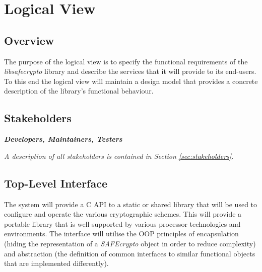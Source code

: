 
\section{Logical View}
\label{sec_view_logical}

\subsection{Overview}

The purpose of the logical view is to specify the functional requirements of the \textit{libsafecrypto} library and describe the services that it will provide to its end-users. To this end the logical view will maintain a design model that provides a concrete description of the library's functional behaviour.

\subsection{Stakeholders}

\textbf{\textit{Developers, Maintainers, Testers}}

\textit{A description of all stakeholders is contained in Section \ref{sec:stakeholders}.}

\subsection{Top-Level Interface}

The system will provide a C API to a static or shared library that will be used to configure and operate the various cryptographic schemes. This will provide a portable library that is well supported by various processor technologies and environments. The interface will utilise the OOP principles of encapsulation (hiding the representation of a \textit{SAFEcrypto} object in order to reduce complexity) and abstraction (the definition of common interfaces to similar functional objects that are implemented differently). 

